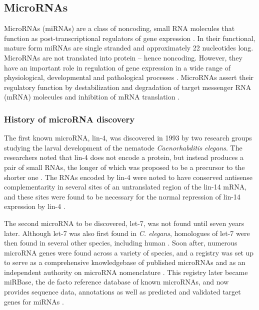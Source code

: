 \subsection{MicroRNAs}\label{micrornas}

MicroRNAs (miRNAs) are a class of noncoding, small RNA molecules that function
as post-transcriptional regulators of gene expression \citep{Ambros2004}. In
their functional, mature form miRNAs are single stranded and approximately 22
nucleotides long. MicroRNAs are not translated into protein -- hence
noncoding. However, they have an important role in regulation of gene
expression in a wide range of physiological, developmental and pathological
processes \citep{Bartel2009}. MicroRNAs assert their regulatory function by destabilization and
degradation of target messenger RNA (mRNA) molecules and inhibition of mRNA
translation \citep{Fabian2010}.



\subsubsection{History of microRNA discovery}

The first known microRNA, lin-4, was discovered in 1993 by two research groups
studying the larval development of the nematode \emph{Caenorhabditis elegans}.
The researchers noted that lin-4 does not encode a protein, but instead
produces a pair of small RNAs, the longer of which was proposed to be a
precursor to the shorter one \citep{Lee1993}. The RNAs encoded by lin-4 were
noted to have conserved antisense complementarity in several sites of an
untranslated region of the lin-14 mRNA, and these sites were found to be
necessary for the normal repression of lin-14 expression by lin-4
\citep{Lee1993,Wightman1993}.

The second microRNA to be discovered, let-7, was not found until seven years
later. Although let-7 was also first found in \emph{C. elegans}, homologues of
let-7 were then found in several other species, including human
\citep{Pasquinelli2000}. Soon after, numerous microRNA genes were found across
a variety of species, and a registry was set up to serve as a comprehensive
knowledgebase of published microRNAs and as an independent authority on
microRNA nomenclature \citep{GriffithsJones2004}. This registry later became
miRBase, the de facto reference database of known microRNAs, and now provides
sequence data, annotations as well as predicted and validated target genes for
miRNAs \citep{Kozomara2014}.

